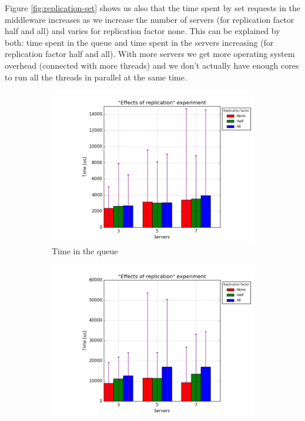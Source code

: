\documentclass[11pt]{article}
\begin{document}
Figure \ref{fig:replication-set} shows us also that the time spent by set requests in the middleware increases as we increase the number of servers (for replication factor half and all) and varies for replication factor none. This can be explained by both: time spent in the queue and time spent in the servers increasing (for replication factor half and all). With more servers we get more operating system overhead (connected with more threads) and we don't actually have enough cores to run all the threads in parallel at the same time. 



\begin{figure}
\centering
\begin{subfigure}{.5\textwidth}
	\centering
	\includegraphics[width=\linewidth]{plots/replication-set-queue}
	\caption{Time in the queue}
	\label{fig:replication-set-queue}
\end{subfigure}%
\begin{subfigure}{.5\textwidth}
	\centering
	\includegraphics[width=\linewidth]{plots/replication-set-servers}

\end{subfigure}
\end{figure}
\end{document}
